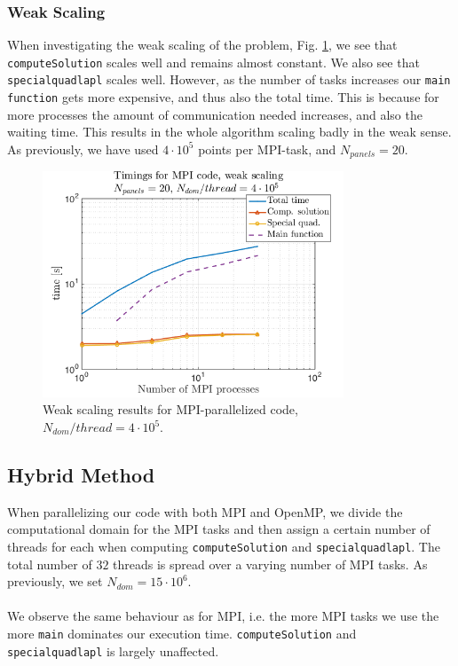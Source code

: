 \documentclass[a4paper,10pt]{article}
\def\code#1{\texttt{#1}}
\begin{document}
\subsubsection*{Weak Scaling}
When investigating the weak scaling of the problem, Fig. \ref{fig:mpi_weaktime}, we see that \code{computeSolution} scales well and remains almost constant. We also see that \code{specialquadlapl} scales well. However, as the number of tasks increases our \code{main function} gets more expensive, and thus also the total time. This is because for more processes the amount of communication needed increases, and also the waiting time. This results in the whole algorithm scaling badly in the weak sense. As previously, we have used $4\cdot 10^5$ points per MPI-task, and $N_{panels}=20$.
\begin{figure}[ht]
    \begin{center}
        \includegraphics[width=0.8\textwidth]{Graphics/craypat_mpi_weakscaling.png}
    \end{center}
    \caption{Weak scaling results for MPI-parallelized code, $N_{dom}/thread=4\cdot 10^5$.}
    \label{fig:mpi_weaktime}
\end{figure}


\FloatBarrier

\subsection*{Hybrid Method}
When parallelizing our code with both MPI and OpenMP, we divide the computational domain for the MPI tasks and then assign a certain number of threads for each when computing \code{computeSolution} and \code{specialquadlapl}. The total number of $32$ threads is spread over a varying number of MPI tasks. As previously, we set $N_{dom}=15\cdot10^6$. 
\\ \\
We observe the same behaviour as for MPI, i.e. the more MPI tasks we use the more \code{main} dominates our execution time. \code{computeSolution} and \code{specialquadlapl} is largely unaffected. 
\end{document}

